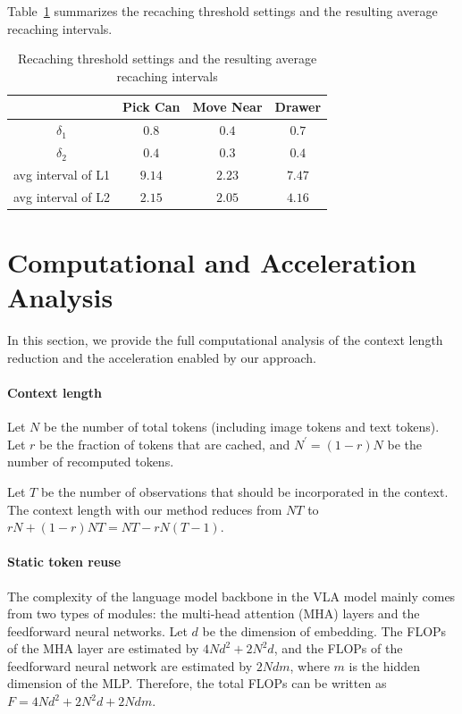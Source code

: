 Table~\ref{tab:interval} summarizes the recaching threshold settings and the resulting average recaching intervals.

\begin{table}[ht]
    \centering
    \caption{Recaching threshold settings and the resulting average recaching intervals}
    \label{tab:interval}
    \begin{tabular}{c|ccc}
    \toprule
         & Pick Can & Move Near & Drawer \\
    \midrule
        $\delta_1$ & $0.8$ & $0.4$ & $0.7$ \\
        $\delta_2$ & $0.4$ &$0.3$ &$0.4$ \\
        avg interval of L1 & $9.14$ & $2.23$ & $7.47$  \\
        avg interval of L2 & $2.15$ & $2.05$ & $4.16$ \\
    \bottomrule
    \end{tabular}

\end{table}

\section{Computational and Acceleration Analysis}
\label{app:complexity}
In this section, we provide the full computational analysis of the context length reduction and the acceleration enabled by our approach.

\paragraph{Context length}
Let $N$ be the number of total tokens (including image tokens and text tokens). Let $r$ be the fraction of tokens that are cached, and $N^\prime = (1-r) N$ be the number of recomputed tokens.

Let $T$ be the number of observations that should be incorporated in the context. The context length with our method reduces from $NT$ to $rN + (1-r)NT=NT-rN(T-1)$.

\paragraph{Static token reuse}
The complexity of the language model backbone in the VLA model mainly comes from two types of modules: the multi-head attention (MHA) layers and the feedforward neural networks. Let $d$ be the dimension of embedding. The FLOPs of the MHA layer are estimated by $4Nd^2+2N^2d$, and the FLOPs of the feedforward neural network are estimated by $2Ndm$, where $m$ is the hidden dimension of the MLP. Therefore, the total FLOPs can be written as $F=4Nd^2+2N^2d+2Ndm$.

